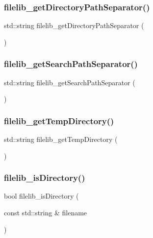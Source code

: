 \subsubsection{\texorpdfstring{filelib\+\_\+get\+Directory\+Path\+Separator()}{filelib\_getDirectoryPathSeparator()}}
{\footnotesize\ttfamily std\+::string filelib\+\_\+get\+Directory\+Path\+Separator (\begin{DoxyParamCaption}{ }\end{DoxyParamCaption})}

\mbox{\label{namespaceplatform_a9641200cba6781202640c6b723341af2}} 
\subsubsection{\texorpdfstring{filelib\+\_\+get\+Search\+Path\+Separator()}{filelib\_getSearchPathSeparator()}}
{\footnotesize\ttfamily std\+::string filelib\+\_\+get\+Search\+Path\+Separator (\begin{DoxyParamCaption}{ }\end{DoxyParamCaption})}

\mbox{\label{namespaceplatform_a969c5e3fc13cd635656eba2845bc932e}} 
\subsubsection{\texorpdfstring{filelib\+\_\+get\+Temp\+Directory()}{filelib\_getTempDirectory()}}
{\footnotesize\ttfamily std\+::string filelib\+\_\+get\+Temp\+Directory (\begin{DoxyParamCaption}{ }\end{DoxyParamCaption})}

\mbox{\label{namespaceplatform_a68319ac7586223f385d7785f1b38e1b9}} 
\subsubsection{\texorpdfstring{filelib\+\_\+is\+Directory()}{filelib\_isDirectory()}}
{\footnotesize\ttfamily bool filelib\+\_\+is\+Directory (\begin{DoxyParamCaption}\item[{const std\+::string \&}]{filename }\end{DoxyParamCaption})}

